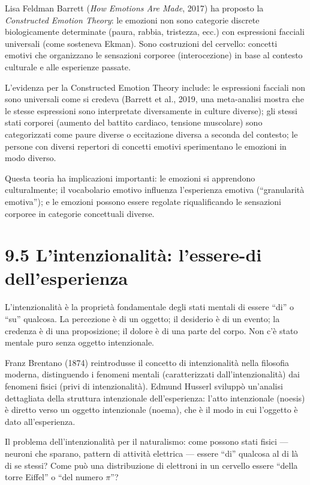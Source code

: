 \documentclass[11.5pt,a4paper,openany]{book}
\theoremstyle{remark}
\begin{document}
Lisa Feldman Barrett (\textit{How Emotions Are Made}, 2017) ha proposto la \textit{Constructed Emotion Theory}: le emozioni non sono categorie discrete biologicamente determinate (paura, rabbia, tristezza, ecc.) con espressioni facciali universali (come sosteneva Ekman). Sono costruzioni del cervello: concetti emotivi che organizzano le sensazioni corporee (interocezione) in base al contesto culturale e alle esperienze passate.

L'evidenza per la Constructed Emotion Theory include: le espressioni facciali non sono universali come si credeva (Barrett et al., 2019, una meta-analisi mostra che le stesse espressioni sono interpretate diversamente in culture diverse); gli stessi stati corporei (aumento del battito cardiaco, tensione muscolare) sono categorizzati come paure diverse o eccitazione diversa a seconda del contesto; le persone con diversi repertori di concetti emotivi sperimentano le emozioni in modo diverso.

Questa teoria ha implicazioni importanti: le emozioni si apprendono culturalmente; il vocabolario emotivo influenza l'esperienza emotiva (``granularità emotiva''); e le emozioni possono essere regolate riqualificando le sensazioni corporee in categorie concettuali diverse.

\section{9.5 L'intenzionalità: l'essere-di dell'esperienza}

L'intenzionalità è la proprietà fondamentale degli stati mentali di essere ``di'' o ``su'' qualcosa. La percezione è di un oggetto; il desiderio è di un evento; la credenza è di una proposizione; il dolore è di una parte del corpo. Non c'è stato mentale puro senza oggetto intenzionale.

Franz Brentano (1874) reintrodusse il concetto di intenzionalità nella filosofia moderna, distinguendo i fenomeni mentali (caratterizzati dall'intenzionalità) dai fenomeni fisici (privi di intenzionalità). Edmund Husserl sviluppò un'analisi dettagliata della struttura intenzionale dell'esperienza: l'atto intenzionale (noesis) è diretto verso un oggetto intenzionale (noema), che è il modo in cui l'oggetto è dato all'esperienza.

Il problema dell'intenzionalità per il naturalismo: come possono stati fisici --- neuroni che sparano, pattern di attività elettrica --- essere ``di'' qualcosa al di là di se stessi? Come può una distribuzione di elettroni in un cervello essere ``della torre Eiffel'' o ``del numero $\pi$''?
\end{document}
